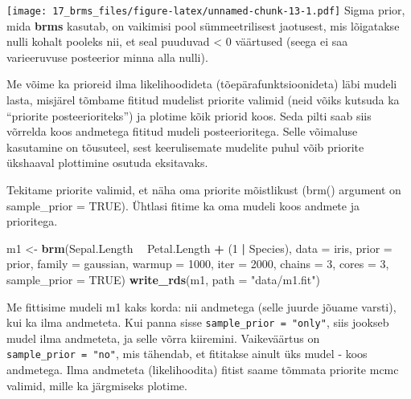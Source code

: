 \documentclass[]{book}
\newenvironment{Shaded}{\begin{snugshade}}{\end{snugshade}}
\newcommand{\DataTypeTok}[1]{\textcolor[rgb]{0.13,0.29,0.53}{#1}}
\newcommand{\DecValTok}[1]{\textcolor[rgb]{0.00,0.00,0.81}{#1}}
\newcommand{\KeywordTok}[1]{\textcolor[rgb]{0.13,0.29,0.53}{\textbf{#1}}}
\newcommand{\NormalTok}[1]{#1}
\newcommand{\OperatorTok}[1]{\textcolor[rgb]{0.81,0.36,0.00}{\textbf{#1}}}
\newcommand{\OtherTok}[1]{\textcolor[rgb]{0.56,0.35,0.01}{#1}}
\newcommand{\StringTok}[1]{\textcolor[rgb]{0.31,0.60,0.02}{#1}}
\begin{document}
\texttt{[image: 17\_brms\_files/figure-latex/unnamed-chunk-13-1.pdf]}
Sigma prior, mida \textbf{brms} kasutab, on vaikimisi pool sümmeetrilisest jaotusest, mis lõigatakse nulli kohalt pooleks nii, et seal puuduvad \textless{} 0 väärtused (seega ei saa varieeruvuse posteerior minna alla nulli).

Me võime ka prioreid ilma likelihoodideta (tõepärafunktsioonideta) läbi mudeli lasta, misjärel tõmbame fititud mudelist priorite valimid (neid võiks kutsuda ka ``priorite posteerioriteks'') ja plotime kõik priorid koos. Seda pilti saab siis võrrelda koos andmetega fititud mudeli posteerioritega. Selle võimaluse kasutamine on tõusuteel, sest keerulisemate mudelite puhul võib priorite ükshaaval plottimine osutuda eksitavaks.

Tekitame priorite valimid, et näha oma priorite mõistlikust (brm() argument on sample\_prior = TRUE). Ühtlasi fitime ka oma mudeli koos andmete ja prioritega.

\begin{Shaded}
\begin{Highlighting}[]
\NormalTok{m1 <-}\StringTok{ }\KeywordTok{brm}\NormalTok{(Sepal.Length }\OperatorTok{~}\StringTok{ }\NormalTok{Petal.Length }\OperatorTok{+}\StringTok{ }\NormalTok{(}\DecValTok{1} \OperatorTok{|}\StringTok{ }\NormalTok{Species), }
          \DataTypeTok{data =}\NormalTok{ iris, }
          \DataTypeTok{prior =}\NormalTok{ prior, }
          \DataTypeTok{family =}\NormalTok{ gaussian,}
          \DataTypeTok{warmup =} \DecValTok{1000}\NormalTok{,}
          \DataTypeTok{iter =} \DecValTok{2000}\NormalTok{,}
          \DataTypeTok{chains =} \DecValTok{3}\NormalTok{,}
          \DataTypeTok{cores =} \DecValTok{3}\NormalTok{,}
          \DataTypeTok{sample_prior =} \OtherTok{TRUE}\NormalTok{)}
\KeywordTok{write_rds}\NormalTok{(m1, }\DataTypeTok{path =} \StringTok{"data/m1.fit"}\NormalTok{)}
\end{Highlighting}
\end{Shaded}

Me fittisime mudeli m1 kaks korda: nii andmetega (selle juurde jõuame varsti), kui ka ilma andmeteta. Kui panna sisse \texttt{sample\_prior\ =\ "only"}, siis jookseb mudel ilma andmeteta, ja selle võrra kiiremini. Vaikeväärtus on \texttt{sample\_prior\ =\ "no"}, mis tähendab, et fititakse ainult üks mudel - koos andmetega. Ilma andmeteta (likelihoodita) fitist saame tõmmata priorite mcmc valimid, mille ka järgmiseks plotime.

\begin{Shaded}
\end{Shaded}
\end{document}
